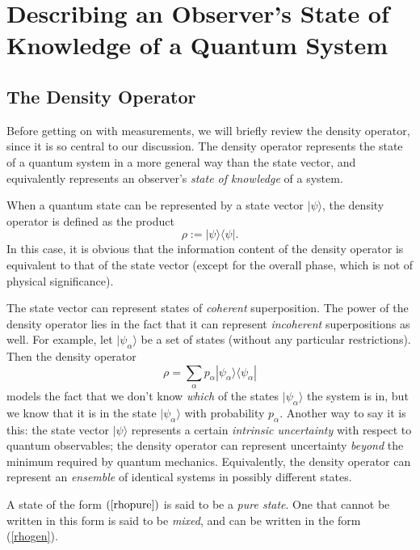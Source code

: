 \documentclass[aps,twocolumn,superscriptaddress,footinbib,floatfix,showpacs]{revtex4}
\def\ket#1{|{#1}\rangle}
\def\bra#1{\langle{#1}|}
\begin{document}
\section{Describing an Observer's State of Knowledge of a Quantum System}
\label{section:basic}

\subsection{The Density Operator}

Before getting on with measurements, we will briefly review the density
operator, since it is so central to our discussion.
The density operator represents the state of a quantum system
in a more general way than the state vector, and equivalently
represents an observer's \textit{state of knowledge} of a system.

When a quantum state can be represented by a state vector $\ket\psi$,
the density operator is defined as the product
\begin{equation}
  \rho := \ket\psi\bra\psi.
  \label{rhopure}
\end{equation}
In this case, it is obvious that the information content
of the density operator is equivalent to that of the state vector
(except for the overall phase, which is not of physical significance).

The state vector can represent states of \textit{coherent} superposition.
The power of the density operator lies in the fact that it can 
represent \textit{incoherent} superpositions as well.
For example, let $\ket{\psi_\alpha}$ be a set of states (without any 
particular restrictions).  Then the density operator 
\begin{equation}
  \rho = \sum_\alpha p_\alpha \ket{\psi_\alpha}\bra{\psi_\alpha}
  \label{rhogen}
\end{equation}
models the fact that we don't know \textit{which} of the
states $\ket{\psi_\alpha}$ the system is in, but we know that
it is in the state $\ket{\psi_\alpha}$ with probability $p_\alpha$.
Another way to say it is this:
the state vector $\ket\psi$ represents a certain
\textit{intrinsic uncertainty} with respect to quantum observables;
the density operator can represent uncertainty \textit{beyond} the minimum
required by quantum mechanics.
Equivalently, the density operator can represent an \textit{ensemble}
of identical systems in possibly different states.

A state of the form $(\ref{rhopure})$ is said to be a \textit{pure state}.
One that cannot be written in this form is said
to be \textit{mixed}, and can be written in the form (\ref{rhogen}).
\end{document}
